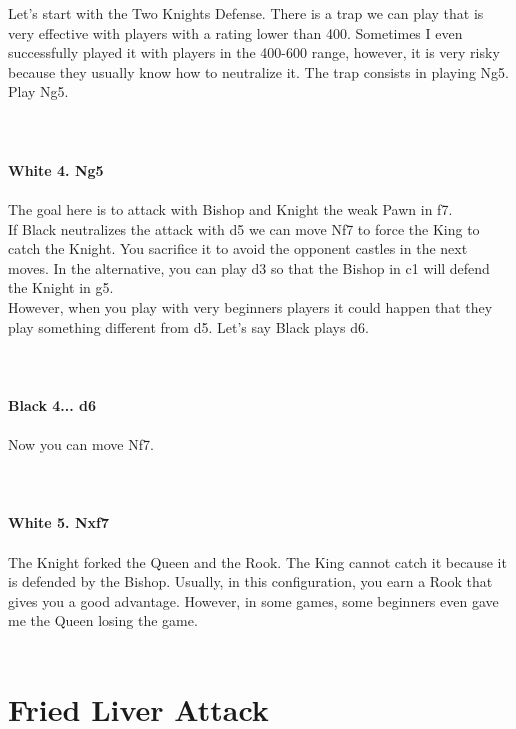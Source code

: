 \documentclass{article}
\begin{document}
Let's start with the Two Knights Defense. There is a trap we can play that is very effective with players with a rating lower than 400. Sometimes I even successfully played it with players in the 400-600 range, however, it is very risky because they usually know how to neutralize it. The trap consists in playing Ng5. Play Ng5.\\
\\

\\
\\
\textbf{White 4. Ng5}\\
\\
The goal here is to attack with Bishop and Knight the weak Pawn in f7.\\If Black neutralizes the attack with d5 we can move Nf7 to force the King to catch the Knight. You sacrifice it to avoid the opponent castles in the next moves. In the alternative, you can play d3 so that the Bishop in c1 will defend the Knight in g5.\\However, when you play with very beginners players it could happen that they play something different from d5. Let's say Black plays d6.\\
\\

\\
\\
\textbf{Black 4... d6}\\
\\
Now you can move Nf7.\\
\\

\\
\\
\textbf{White 5. Nxf7}\\
\\
The Knight forked the Queen and the Rook. The King cannot catch it because it is defended by the Bishop. Usually, in this configuration, you earn a Rook that gives you a good advantage. However, in some games, some beginners even gave me the Queen losing the game.\\
\\
\section{ Fried Liver Attack}
\end{document}
